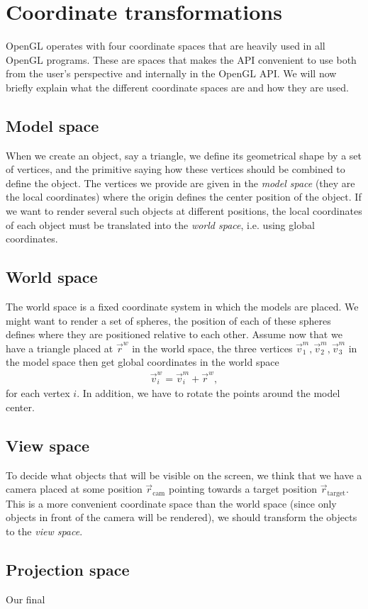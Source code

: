 \section{Coordinate transformations}
\label{sec:opengl_coordinate_transformations}
OpenGL operates with four coordinate spaces that are heavily used in all OpenGL programs. These are spaces that makes the API convenient to use both from the user's perspective and internally in the OpenGL API. We will now briefly explain what the different coordinate spaces are and how they are used.
\subsection{Model space}
When we create an object, say a triangle, we define its geometrical shape by a set of vertices, and the primitive saying how these vertices should be combined to define the object. The vertices we provide are given in the \textit{model space} (they are the local coordinates) where the origin defines the center position of the object. If we want to render several such objects at different positions, the local coordinates of each object must be translated into the \textit{world space}, i.e. using global coordinates.
\subsection{World space}
The world space is a fixed coordinate system in which the models are placed. We might want to render a set of spheres, the position of each of these spheres defines where they are positioned relative to each other. Assume now that we have a triangle placed at $\vec r^{w}$ in the world space, the three vertices $\vec v_1^{m}, \vec v_2^{m}, \vec v_3^{m}$ in the model space then get global coordinates in the world space
\begin{align}
	\vec v_i^{w} = \vec v_i^{m} + \vec r^{w},
\end{align}
for each vertex $i$. In addition, we have to rotate the points around the model center. 
\subsection{View space}
To decide what objects that will be visible on the screen, we think that we have a camera placed at some position $\vec r_\text{cam}$ pointing towards a target position $\vec r_\text{target}$. This is a more convenient coordinate space than the world space (since only objects in front of the camera will be rendered), we should transform the objects to the \textit{view space}. 
\subsection{Projection space}
Our final 